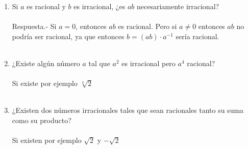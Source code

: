 \begin{enumerate}[\bfseries 1.]
\begin{enumerate}[\bfseries (a)]
	 \item Si $a$ es racional y \; $b$ es irracional, ¿es $ab$ necesariamente irracional?\\\\
	 Respuesta.- \; Si $a=0$, entonces $ab$ es racional. Pero si $a\neq 0$ entonces $ab$ no podría ser racional, ya que entonces $b=(ab) \cdot a^{-1}$ sería racional.\\\\     

	 \item ¿Existe algún número $a$ tal que $a^2$ es irracional pero $a^4$ racional?\\\\
	 Si existe por ejemplo $\sqrt[4]{2}$\\\\

	 \item ¿Existen dos números irracionales tales que sean racionales tanto su suma como su producto?\\\\
	 Si existen por ejemplo $\sqrt{2}$ y $- \sqrt{2}$\\\\
      \end{enumerate}


\end{enumerate}
